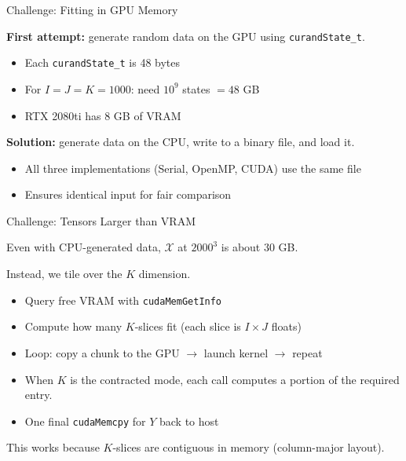\documentclass{beamer}
\begin{document}
\begin{frame}{Challenge: Fitting in GPU Memory}

\textbf{First attempt:} generate random data on the GPU using \texttt{curandState\_t}.

\medskip

\begin{itemize}
  \item Each \texttt{curandState\_t} is 48 bytes
  \item For $I{=}J{=}K{=}1000$: need $10^9$ states $= 48$ GB
  \item RTX 2080ti has 8 GB of VRAM
\end{itemize}

\bigskip

\textbf{Solution:} generate data on the CPU, write to a binary file, and load it.

\begin{itemize}
  \item All three implementations (Serial, OpenMP, CUDA) use the same file
  \item Ensures identical input for fair comparison
\end{itemize}

\end{frame}

\begin{frame}{Challenge: Tensors Larger than VRAM}

Even with CPU-generated data, $\mathcal{X}$ at $2000^3$ is about 30 GB.

\bigskip

Instead, we tile over the $K$ dimension.

\begin{itemize}
  \item Query free VRAM with \texttt{cudaMemGetInfo}
  \item Compute how many $K$-slices fit (each slice is $I \times J$ floats)
  \item Loop: copy a chunk to the GPU $\to$ launch kernel $\to$ repeat
  \item When $K$ is the contracted mode, each call computes a portion of the required entry.
  \item One final \texttt{cudaMemcpy} for $Y$ back to host
\end{itemize}

\medskip

This works because $K$-slices are contiguous in memory (column-major layout).

\end{frame}
\end{document}
